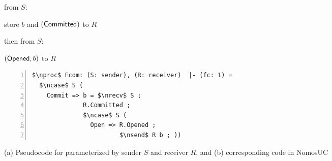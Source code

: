 \begin{figure}
\centering
\begin{minipage}{0.38\textwidth}
\begin{bbox}[title={Functionality $\F_{\m{com}}(S, R)$}]

\OnInput {} from $S$: 

\qquad store $b$ and \Send $(\mathsf{Committed})$ to $R$

then \OnInput {} from $S$: 

\qquad \Send $(\mathsf{Opened}, b)$ to $R$
\end{bbox}
\end{minipage}
\hspace{3em}
\begin{minipage}{0.5\textwidth}
\begin{lstlisting}[basicstyle=\scriptsize\BeraMonottFamily, frame=single, mathescape, numbers=left, xleftmargin=2em, xrightmargin=2em]
$\nproc$ Fcom: (S: sender), (R: receiver)  |- (fc: 1) =
  $\ncase$ S (
    Commit => b = $\nrecv$ S ;
              R.Committed ;
              $\ncase$ S (
                Open => R.Opened ;
                        $\nsend$ R b ; ))
\end{lstlisting}
\end{minipage}
\caption{(a) Pseudocode for \Fcom parameterized by sender $S$ and receiver $R$,
and (b) corresponding code in NomosUC}
\label{fig:fcomideal}
\vspace{-4mm}
\end{figure}

